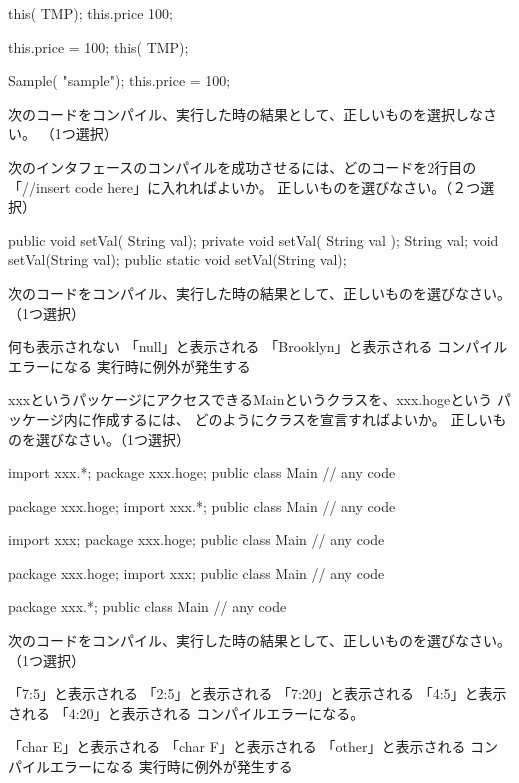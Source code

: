 \documentclass[12pt]{article}
\begin{document}
this( TMP);
this.price  100;

this.price = 100;
this( TMP);

Sample( "sample");
this.price = 100;


次のコードをコンパイル、実行した時の結果として、正しいものを選択しなさい。
（1つ選択）


次のインタフェースのコンパイルを成功させるには、どのコードを2行目の「//insert code here」に入れればよいか。
正しいものを選びなさい。（２つ選択）


public void setVal( String val);
private void setVal( String val );
String val;
void setVal(String val);
public static void setVal(String val);


次のコードをコンパイル、実行した時の結果として、正しいものを選びなさい。
（1つ選択）


何も表示されない
「null」と表示される
「Brooklyn」と表示される
コンパイルエラーになる
実行時に例外が発生する


xxxというパッケージにアクセスできるMainというクラスを、xxx.hogeという
パッケージ内に作成するには、
どのようにクラスを宣言すればよいか。
正しいものを選びなさい。（1つ選択）

import xxx.*;
package xxx.hoge;
public class Main {
    // any code
}

package xxx.hoge;
import xxx.*;
public class Main{
    // any code
}

import xxx;
package xxx.hoge;
public class Main{
    // any code
}

package xxx.hoge;
import xxx;
public  class Main{
    // any code
}

package xxx.*;
public class Main{
    // any code
}


次のコードをコンパイル、実行した時の結果として、正しいものを選びなさい。
（1つ選択）


「7:5」と表示される
「2:5」と表示される
「7:20」と表示される
「4:5」と表示される
「4:20」と表示される
コンパイルエラーになる。



「char E」と表示される
「char F」と表示される
「other」と表示される
コンパイルエラーになる
実行時に例外が発生する
\end{document}

